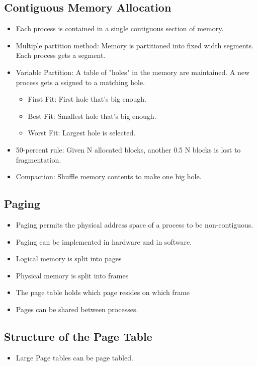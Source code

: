 \documentclass[a4wide,10pt]{article}
\begin{document}
\subsection{Contiguous Memory Allocation} %
\label{sub:contiguous_memory_allocation}
\begin{itemize}
	\item Each process is contained in a single contiguous section of memory.
	\item Multiple partition method: Memory is partitioned into fixed width segments. Each process gets a segment.
	\item Variable Partition: A table of "holes" in the memory are maintained. A new process gets a ssigned to a matching hole.
	\begin{itemize}
		\item First Fit: First hole that's big enough.
		\item Best Fit: Smallest hole that's big enough.
		\item Worst Fit: Largest hole is selected.
	\end{itemize}
	\item 50-percent rule: Given N allocated blocks, another 0.5 N blocks is lost to fragmentation.
	\item Compaction: Shuffle memory contents to make one big hole.
\end{itemize}

\subsection{Paging} %
\label{sub:paging}
\begin{itemize}
	\item Paging permits the physical address space of a process to be non-contiguous.
	\item Paging can be implemented in hardware and in software.
	\item Logical memory is split into pages
	\item Physical memory is split into frames
	\item The page table holds which page resides on which frame
	\item Pages can be shared between processes.
\end{itemize}

\subsection{Structure of the Page Table} %
\label{sub:structure_of_the_page_table}
\begin{itemize}
	\item Large Page tables can be page tabled.
\end{itemize}
\end{document}
